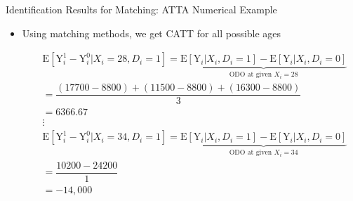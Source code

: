 \documentclass[hyperref={pdfpagelabels=false}]{beamer}
\begin{document}
\begin{frame}{Identification Results for Matching: ATT}{A Numerical Example}
	\begin{itemize}

			\item Using matching methods, we get CATT for all possible ages 
			
			\vspace{0.2cm}
			\begin{equation*}
				\begin{aligned}
					& \mathrm{E}[\mathrm{Y}^{1}_{i}-\mathrm{Y}^{0}_{i}|X_{i}=28, D_{i}=1] = \underbrace{\mathrm{E}[\mathrm{Y}_{i}|X_{i},D_{i}=1] - \mathrm{E}[\mathrm{Y}_{i}|X_{i},D_{i}=0]}_{\text{ODO at given $X_{i}=28$}} \\ 
					&= \dfrac{(17700-8800)+(11500-8800)+ (16300-8800)}{3} \\
					&= 6366.67 \\
					& \vdots \\
					& \mathrm{E}[\mathrm{Y}^{1}_{i}-\mathrm{Y}^{0}_{i}|X_{i}=34, D_{i}=1] = \underbrace{\mathrm{E}[\mathrm{Y}_{i}|X_{i},D_{i}=1] - \mathrm{E}[\mathrm{Y}_{i}|X_{i},D_{i}=0]}_{\text{ODO at given $X_{i}=34$}} \\ 
					&= \dfrac{10200-24200}{1}  \\
					&= −14,000
					
				\end{aligned} 
				
			\end{equation*}	
			
			
			
			
		\end{itemize}
		
	
	
\end{frame}
\end{document}
